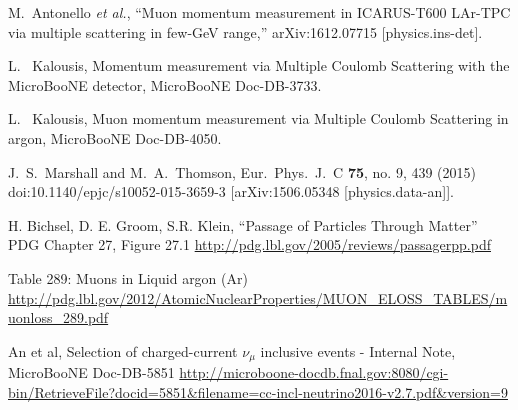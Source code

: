 \begin{thebibliography}{1}
  M.~Antonello {\it et al.},
  ``Muon momentum measurement in ICARUS-T600 LAr-TPC via multiple scattering in few-GeV range,''
  arXiv:1612.07715 [physics.ins-det].

  L. ~Kalousis, 
  Momentum measurement via Multiple Coulomb
  Scattering with the MicroBooNE detector, 
  MicroBooNE Doc-DB-3733.


  L. ~Kalousis, 
  Muon momentum measurement via Multiple Coulomb Scattering in argon,
  MicroBooNE Doc-DB-4050.

  J.~S.~Marshall and M.~A.~Thomson,
  Eur.\ Phys.\ J.\ C {\bf 75}, no. 9, 439 (2015)
  doi:10.1140/epjc/s10052-015-3659-3
  [arXiv:1506.05348 [physics.data-an]].

  H. Bichsel, D. E. Groom, S.R. Klein, ``Passage of Particles Through Matter'' PDG Chapter 27, Figure 27.1 \url{http://pdg.lbl.gov/2005/reviews/passagerpp.pdf}


   Table 289: Muons in Liquid argon (Ar) \url{http://pdg.lbl.gov/2012/AtomicNuclearProperties/MUON_ELOSS_TABLES/muonloss_289.pdf}

  An et al,
  Selection of charged-current $\nu_\mu$ inclusive events - Internal Note,
  MicroBooNE Doc-DB-5851
  \url{http://microboone-docdb.fnal.gov:8080/cgi-bin/RetrieveFile?docid=5851&filename=cc-incl-neutrino2016-v2.7.pdf&version=9}




\end{thebibliography}